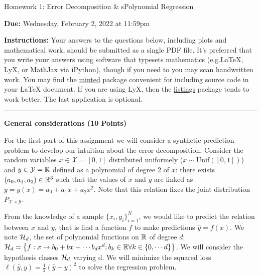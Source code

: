 \documentclass{article}
\newcommand{\bb}{b}
\newcommand{\ruleskip}{\bigskip\hrule\bigskip}
\begin{document}
\pagestyle{myheadings} 

\begin{center}
{\Large
Homework 1: Error Decomposition \& sPolynomial Regression
} 
\end{center}

{
{ \color{nyupurple} \textbf{Due:} Wednesday, February 2, 2022 at 11:59pm} 
} 

\textbf{Instructions: }Your answers to the questions below, including plots and mathematical
 work, should be submitted as a single PDF file.  It's preferred that you write your answers using software that typesets mathematics (e.g.LaTeX, LyX, or MathJax via iPython), though if you need to you may scan handwritten work.  You may find the \href{https://github.com/gpoore/minted}{minted} package convenient for including source code in your LaTeX document.  If you are using LyX, then the \href{https://en.wikibooks.org/wiki/LaTeX/Source_Code_Listings}{listings} package tends to work better. The last application is optional. 

 \ruleskip

\textbf{\color{nyupurple} General considerations (10 Points)}

For the first part of this assignment we will consider a synthetic prediction problem to develop our intuition about the error decomposition. Consider the random variables $x \in \mathcal{X} = [0,1]$ distributed uniformely ($ x \sim \mathrm{Unif}([0,1])$) and $y \in \mathcal{Y} = {\mathbb{R}}$ defined as a polynomial of degree 2 of $x$: there exists $(a_0, a_1, a_2) \in {\mathbb{R}}^3$ such that the values of $x$ and $y$ are linked as $y = g(x) = a_0 + a_1 x + a_2 x^2$. Note that this relation fixes the joint distribution $P_{\mathcal{X} \times \mathcal{Y}}$.

From the knowledge of a sample $\{x_i, y_i\}_{i=1}^N$, we would like to predict the relation between $x$ and $y$, that is find a function $f$ to make predictions $\hat{y} = f(x)$. We note ${\mathcal{H}}_d$, the set of polynomial functions on $\mathbb{R}$ of degree $d$: $\gH_d = \left\{f: x \rightarrow \bb_0 + \bb x + \cdots \bb_d x^d; \bb_k \in \sR \forall k\in \{0, \cdots d\} \right\}$. We will consider the hypothesis classes ${\mathcal{H}}_d$ varying d.
We will minimize the squared loss $\ell(\hat{y},y) = \frac 1 2 (\hat{y} - y)^2$ to solve the regression problem.
\end{document}
